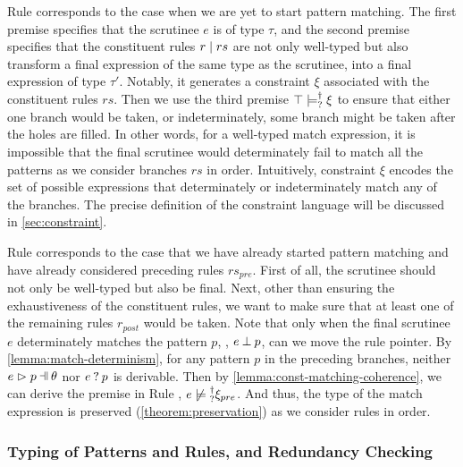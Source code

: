 Rule \TMatchZPre corresponds to the case when we are yet to start pattern
matching. The first premise specifies that the scrutinee $e$ is of type $\tau$,
and the second premise specifies that the constituent rules $r \mid rs$ are not only
well-typed but also transform a final expression of the same type as the
scrutinee, into a final expression of type $\tau'$. Notably, it generates a
constraint $\xi$ associated with the constituent rules $rs$. Then we use the
third premise $\top \models_{?}^{\dag} \xi$ to ensure that either 
one branch would be taken, or indeterminately, some branch might be taken after the holes are filled. 
In other words, for a well-typed match expression,
it is impossible that the final scrutinee would determinately fail to match all the patterns as we consider branches $rs$ in order.
Intuitively, constraint $\xi$ encodes the set of possible expressions that determinately or indeterminately match any of the branches. 
The precise definition of the constraint language will be discussed in  
\autoref{sec:constraint}. 

Rule \TMatchNZPre corresponds to the case that we have already started pattern
matching and have already considered preceding rules $rs_{pre}$. First of all,
the scrutinee should not only be well-typed but also be final. Next, other than
ensuring the exhaustiveness of the constituent rules, we want to make sure that
at least one of the remaining rules $r_{post}$ would be taken. Note
that only when the final scrutinee $e$ determinately matches the pattern $p$, \ie,
$e \mathbin{\bot} p$, can we move the rule pointer. By
\autoref{lemma:match-determinism}, for any pattern $p$ in the preceding
branches, neither $\hpatmatch{e}{p}{\theta}$ nor $e \mathbin{?} p$ is derivable.
Then by \autoref{lemma:const-matching-coherence}, we can derive the premise
in Rule \TMatchNZPre, $\cnotsatisfyormay{e}{\xi_{pre}}$. And thus, the type of
the match expression is preserved (\autoref{theorem:preservation}) as we consider rules in order.

\subsubsection{Typing of Patterns and Rules, and Redundancy Checking}
\label{sec:pattyp}

